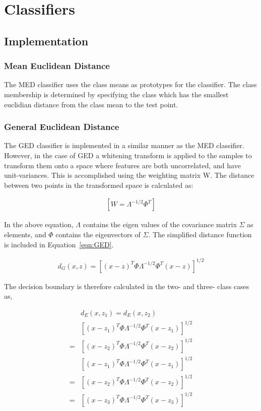 \section{Classifiers}

\subsection{Implementation}

\subsubsection{Mean Euclidean Distance}

The MED classifier uses the class means as prototypes for the classifier. The class membership is determined by specifying the class which has the smallest euclidian distance from the class mean to the test point.

\subsubsection{General Euclidean Distance}
The GED classifier is implemented in a similar manner as the MED classifier. However, in the case of GED a whitening transform is applied to the samples to transform them onto a space where features are both uncorrelated, and have unit-variances. This is accomplished using the weighting matrix W. The distance between two points in the transformed space is calculated as:


\begin{eqnarray}
\label{eqn:GED-whitening}
\left [ W=\Lambda^{-1/2}\Phi^{T}  \right ]
\end{eqnarray}



In the above equation, $\Lambda$ contains the eigen values of the covariance matrix $\Sigma$ as elements, and $\Phi$ contains the eigenvectors of $\Sigma$. The simplified distance function is included in Equation~\ref{eqn:GED}.

\begin{eqnarray}
\label{eqn:GED}
{d}_{G}(x,z) = {\left [ (x-z)^{T}\Phi\Lambda^{-1/2}\Phi^{T}(x-z) \right ]}^{1/2}
\end{eqnarray}


The decision boundary is therefore calculated in the two- and three- class cases as,

\begin{eqnarray}
\label{eqn:boundary-GED}
& d_{E} (x,z_{1}) = d_{E} (x,z_{2}) \\
& \left [ (x-{z}_{1})^{T}\Phi\Lambda^{-1/2}\Phi^{T}(x-z_{1}) \right ]^{1/2} \\
= & \left [ (x-z_{2})^{T}\Phi\Lambda^{-1/2}\Phi^{T}(x-z_{2}) \right ]^{1/2}  \nonumber \\
&\left [ (x-{z}_{1})^{T}\Phi\Lambda^{-1/2}\Phi^{T}(x-z_{1}) \right ]^{1/2} \\
= &\left [ (x-z_{2})^{T}\Phi\Lambda^{-1/2}\Phi^{T}(x-z_{2}) \right ]^{1/2}  \nonumber \\
= &\left [ (x-z_{3})^{T}\Phi\Lambda^{-1/2}\Phi^{T}(x-z_{3}) \right ]^{1/2}  \nonumber
\end{eqnarray}



